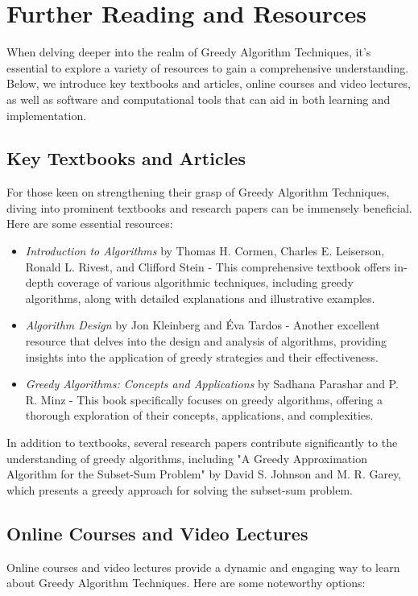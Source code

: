 \documentclass[12pt]{book} %
\begin{document}
\section{Further Reading and Resources}
When delving deeper into the realm of Greedy Algorithm Techniques, it's essential to explore a variety of resources to gain a comprehensive understanding. Below, we introduce key textbooks and articles, online courses and video lectures, as well as software and computational tools that can aid in both learning and implementation.

\subsection{Key Textbooks and Articles}
For those keen on strengthening their grasp of Greedy Algorithm Techniques, diving into prominent textbooks and research papers can be immensely beneficial. Here are some essential resources:

\begin{itemize}
    \item \textit{Introduction to Algorithms} by Thomas H. Cormen, Charles E. Leiserson, Ronald L. Rivest, and Clifford Stein - This comprehensive textbook offers in-depth coverage of various algorithmic techniques, including greedy algorithms, along with detailed explanations and illustrative examples.
    \item \textit{Algorithm Design} by Jon Kleinberg and Éva Tardos - Another excellent resource that delves into the design and analysis of algorithms, providing insights into the application of greedy strategies and their effectiveness.
    \item \textit{Greedy Algorithms: Concepts and Applications} by Sadhana Parashar and P. R. Minz - This book specifically focuses on greedy algorithms, offering a thorough exploration of their concepts, applications, and complexities.
\end{itemize}

In addition to textbooks, several research papers contribute significantly to the understanding of greedy algorithms, including "A Greedy Approximation Algorithm for the Subset-Sum Problem" by David S. Johnson and M. R. Garey, which presents a greedy approach for solving the subset-sum problem.

\subsection{Online Courses and Video Lectures}
Online courses and video lectures provide a dynamic and engaging way to learn about Greedy Algorithm Techniques. Here are some noteworthy options:
\end{document}
